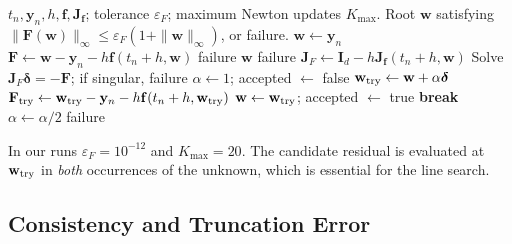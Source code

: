 \documentclass[11pt,a4paper]{article}
\theoremstyle{definition}
\theoremstyle{remark}
\begin{document}
\begin{algorithm}[htbp]
\caption{One Implicit Euler step with residual-decreasing damped Newton}
\label{alg:implicit_euler_newton}
\footnotesize
\begin{algorithmic}[1]
\Require $t_n,\mathbf y_n,h,\mathbf f,\mathbf J_{\mathbf f}$; tolerance
  $\varepsilon_F$; maximum Newton updates $K_{\max}$.
\Ensure Root $\mathbf w$ satisfying
  $\|\mathbf F(\mathbf w)\|_\infty\leq
  \varepsilon_F(1+\|\mathbf w\|_\infty)$, or failure.
\State $\mathbf w\gets\mathbf y_n$ 
    \State $\mathbf F\gets\mathbf w-\mathbf y_n-h\mathbf f(t_n+h,\mathbf w)$
        \State \Return failure
    \EndIf
        \State \Return $\mathbf w$
    \EndIf
        \State \Return failure
    \EndIf
    \State $\mathbf J_F\gets\mathbf I_d-h\mathbf J_{\mathbf f}(t_n+h,\mathbf w)$
    \State Solve $\mathbf J_F\boldsymbol\delta=-\mathbf F$;
           if singular, \Return failure
    \State $\alpha\gets1$; accepted $\gets$ false
        \State $\mathbf w_{\rm try}\gets\mathbf w+\alpha\boldsymbol\delta$
        \State $\mathbf F_{\rm try}\gets
          \mathbf w_{\rm try}-\mathbf y_n-h\mathbf f(t_n+h,\mathbf w_{\rm try})$
            \State $\mathbf w\gets\mathbf w_{\rm try}$; accepted $\gets$ true
            \State \textbf{break}
        \EndIf
        \State $\alpha\gets\alpha/2$
    \EndWhile
        \State \Return failure
    \EndIf
\EndFor
\end{algorithmic}
\end{algorithm}

In our runs $\varepsilon_F=10^{-12}$ and $K_{\max}=20$. The candidate
residual is evaluated at $\mathbf w_{\rm try}$ in \emph{both} occurrences of
the unknown, which is essential for the line search.



\subsection{Consistency and Truncation Error}

\label{sec:consistency_and_truncation_error}
\end{document}
